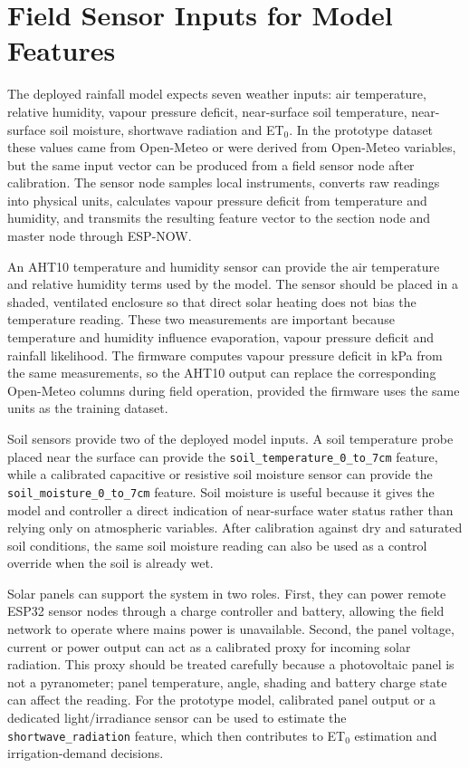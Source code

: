 \documentclass[12pt,a4paper]{report}
\begin{document}
\section{Field Sensor Inputs for Model Features}
The deployed rainfall model expects seven weather inputs: air temperature, relative humidity, vapour pressure deficit, near-surface soil temperature, near-surface soil moisture, shortwave radiation and ET$_0$. In the prototype dataset these values came from Open-Meteo or were derived from Open-Meteo variables, but the same input vector can be produced from a field sensor node after calibration. The sensor node samples local instruments, converts raw readings into physical units, calculates vapour pressure deficit from temperature and humidity, and transmits the resulting feature vector to the section node and master node through ESP-NOW.

An AHT10 temperature and humidity sensor can provide the air temperature and relative humidity terms used by the model. The sensor should be placed in a shaded, ventilated enclosure so that direct solar heating does not bias the temperature reading. These two measurements are important because temperature and humidity influence evaporation, vapour pressure deficit and rainfall likelihood. The firmware computes vapour pressure deficit in kPa from the same measurements, so the AHT10 output can replace the corresponding Open-Meteo columns during field operation, provided the firmware uses the same units as the training dataset.

Soil sensors provide two of the deployed model inputs. A soil temperature probe placed near the surface can provide the \texttt{soil\_temperature\_0\_to\_7cm} feature, while a calibrated capacitive or resistive soil moisture sensor can provide the \texttt{soil\_moisture\_0\_to\_7cm} feature. Soil moisture is useful because it gives the model and controller a direct indication of near-surface water status rather than relying only on atmospheric variables. After calibration against dry and saturated soil conditions, the same soil moisture reading can also be used as a control override when the soil is already wet.

Solar panels can support the system in two roles. First, they can power remote ESP32 sensor nodes through a charge controller and battery, allowing the field network to operate where mains power is unavailable. Second, the panel voltage, current or power output can act as a calibrated proxy for incoming solar radiation. This proxy should be treated carefully because a photovoltaic panel is not a pyranometer; panel temperature, angle, shading and battery charge state can affect the reading. For the prototype model, calibrated panel output or a dedicated light/irradiance sensor can be used to estimate the \texttt{shortwave\_radiation} feature, which then contributes to ET$_0$ estimation and irrigation-demand decisions.
\end{document}
